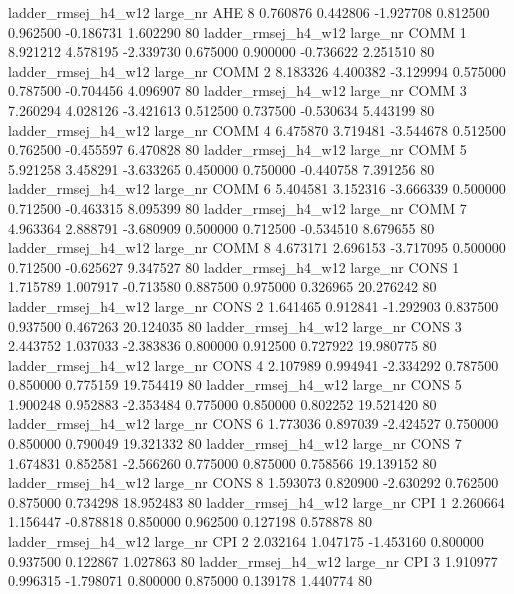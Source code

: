 ladder_rmsej_h4_w12   large_nr      AHE                 8  0.760876  0.442806  -1.927708 0.812500 0.962500 -0.186731    1.602290 80
ladder_rmsej_h4_w12   large_nr     COMM                 1  8.921212  4.578195  -2.339730 0.675000 0.900000 -0.736622    2.251510 80
ladder_rmsej_h4_w12   large_nr     COMM                 2  8.183326  4.400382  -3.129994 0.575000 0.787500 -0.704456    4.096907 80
ladder_rmsej_h4_w12   large_nr     COMM                 3  7.260294  4.028126  -3.421613 0.512500 0.737500 -0.530634    5.443199 80
ladder_rmsej_h4_w12   large_nr     COMM                 4  6.475870  3.719481  -3.544678 0.512500 0.762500 -0.455597    6.470828 80
ladder_rmsej_h4_w12   large_nr     COMM                 5  5.921258  3.458291  -3.633265 0.450000 0.750000 -0.440758    7.391256 80
ladder_rmsej_h4_w12   large_nr     COMM                 6  5.404581  3.152316  -3.666339 0.500000 0.712500 -0.463315    8.095399 80
ladder_rmsej_h4_w12   large_nr     COMM                 7  4.963364  2.888791  -3.680909 0.500000 0.712500 -0.534510    8.679655 80
ladder_rmsej_h4_w12   large_nr     COMM                 8  4.673171  2.696153  -3.717095 0.500000 0.712500 -0.625627    9.347527 80
ladder_rmsej_h4_w12   large_nr     CONS                 1  1.715789  1.007917  -0.713580 0.887500 0.975000  0.326965   20.276242 80
ladder_rmsej_h4_w12   large_nr     CONS                 2  1.641465  0.912841  -1.292903 0.837500 0.937500  0.467263   20.124035 80
ladder_rmsej_h4_w12   large_nr     CONS                 3  2.443752  1.037033  -2.383836 0.800000 0.912500  0.727922   19.980775 80
ladder_rmsej_h4_w12   large_nr     CONS                 4  2.107989  0.994941  -2.334292 0.787500 0.850000  0.775159   19.754419 80
ladder_rmsej_h4_w12   large_nr     CONS                 5  1.900248  0.952883  -2.353484 0.775000 0.850000  0.802252   19.521420 80
ladder_rmsej_h4_w12   large_nr     CONS                 6  1.773036  0.897039  -2.424527 0.750000 0.850000  0.790049   19.321332 80
ladder_rmsej_h4_w12   large_nr     CONS                 7  1.674831  0.852581  -2.566260 0.775000 0.875000  0.758566   19.139152 80
ladder_rmsej_h4_w12   large_nr     CONS                 8  1.593073  0.820900  -2.630292 0.762500 0.875000  0.734298   18.952483 80
ladder_rmsej_h4_w12   large_nr      CPI                 1  2.260664  1.156447  -0.878818 0.850000 0.962500  0.127198    0.578878 80
ladder_rmsej_h4_w12   large_nr      CPI                 2  2.032164  1.047175  -1.453160 0.800000 0.937500  0.122867    1.027863 80
ladder_rmsej_h4_w12   large_nr      CPI                 3  1.910977  0.996315  -1.798071 0.800000 0.875000  0.139178    1.440774 80
